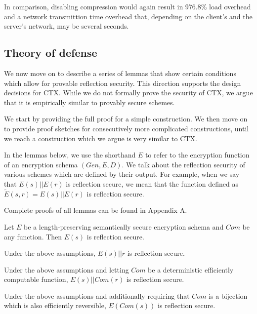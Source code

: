 In comparison, disabling compression would again result in 976.8\% load overhead
and a network transmittion time overhead that, depending on the client's and the
server's network, may be several seconds.

\subsection{Theory of defense}

We now move on to describe a series of lemmas that show certain conditions
which allow for provable reflection security. This direction supports
the design decisions for CTX. While we do not formally prove the security of
CTX, we argue that it is empirically similar to provably secure schemes.

We start by providing the full proof for a simple construction. We then move on
to provide proof sketches for consecutively more complicated constructions,
until we reach a construction which we argue is very similar to CTX.

In the lemmas below, we use the shorthand $E$ to refer to the encryption
function of an encryption schema $(Gen, E, D)$. We talk about the reflection
security of various schemes which are defined by their output. For example,
when we say that $E(s) || E(r)$ is reflection secure, we mean that the function
defined as $\widetilde{E}(s, r) = E(s) || E(r)$ is reflection secure.

Complete proofs of all lemmas can be found in Appendix A.

\begin{lemma}
    Let $E$ be a length-preserving semantically secure encryption schema and
    $Com$ be any function. Then $E(s)$ is reflection secure.
\end{lemma}

\begin{lemma}
    Under the above assumptions, $E(s) || r$ is reflection secure.
\end{lemma}

\begin{lemma}
    Under the above assumptions and letting $Com$ be a deterministic
    efficiently computable function, $E(s) || Com(r)$ is reflection secure.
\end{lemma}

\begin{lemma}
    Under the above assumptions and additionally requiring that $Com$ is a
    bijection which is also efficiently reversible, $E(Com(s))$ is reflection secure.
\end{lemma}


